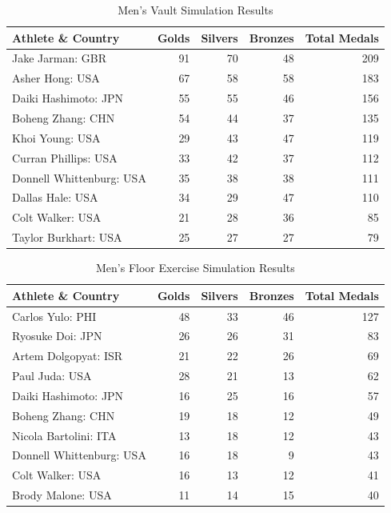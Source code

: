 \documentclass[
  10.5pt,
  letterpaper,
  DIV=11,
  numbers=noendperiod]{scrartcl}
\begin{document}
\begin{table}[H]

\caption{Men's Vault Simulation Results }
\centering
\fontsize{8}{10}\selectfont
\begin{tabular}[t]{l|r|r|r|r}
\hline
Athlete \& Country & Golds & Silvers & Bronzes & Total Medals\\
\hline
Jake Jarman: GBR & 91 & 70 & 48 & 209\\
\hline
Asher Hong: USA & 67 & 58 & 58 & 183\\
\hline
Daiki Hashimoto: JPN & 55 & 55 & 46 & 156\\
\hline
Boheng Zhang: CHN & 54 & 44 & 37 & 135\\
\hline
Khoi Young: USA & 29 & 43 & 47 & 119\\
\hline
Curran Phillips: USA & 33 & 42 & 37 & 112\\
\hline
Donnell Whittenburg: USA & 35 & 38 & 38 & 111\\
\hline
Dallas Hale: USA & 34 & 29 & 47 & 110\\
\hline
Colt Walker: USA & 21 & 28 & 36 & 85\\
\hline
Taylor Burkhart: USA & 25 & 27 & 27 & 79\\
\hline
\end{tabular}
\end{table}

\begin{table}[H]

\caption{Men's Floor Exercise Simulation Results }
\centering
\fontsize{9}{11}\selectfont
\begin{tabular}[t]{l|r|r|r|r}
\hline
Athlete \& Country & Golds & Silvers & Bronzes & Total Medals\\
\hline
Carlos Yulo: PHI & 48 & 33 & 46 & 127\\
\hline
Ryosuke Doi: JPN & 26 & 26 & 31 & 83\\
\hline
Artem Dolgopyat: ISR & 21 & 22 & 26 & 69\\
\hline
Paul Juda: USA & 28 & 21 & 13 & 62\\
\hline
Daiki Hashimoto: JPN & 16 & 25 & 16 & 57\\
\hline
Boheng Zhang: CHN & 19 & 18 & 12 & 49\\
\hline
Nicola Bartolini: ITA & 13 & 18 & 12 & 43\\
\hline
Donnell Whittenburg: USA & 16 & 18 & 9 & 43\\
\hline
Colt Walker: USA & 16 & 13 & 12 & 41\\
\hline
Brody Malone: USA & 11 & 14 & 15 & 40\\
\hline
\end{tabular}
\end{table}
\end{document}
